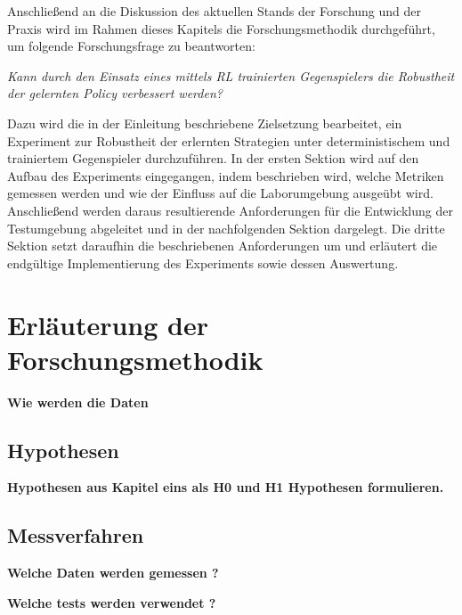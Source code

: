 Anschließend an die Diskussion des aktuellen Stands der Forschung und der Praxis wird im Rahmen dieses Kapitels die Forschungsmethodik durchgeführt, um folgende Forschungsfrage zu beantworten:

\textit{Kann durch den Einsatz eines mittels RL trainierten Gegenspielers die Robustheit der gelernten Policy verbessert werden?}

Dazu wird die in der Einleitung beschriebene Zielsetzung bearbeitet, ein Experiment zur Robustheit der erlernten Strategien unter deterministischem und trainiertem Gegenspieler durchzuführen.
In der ersten Sektion wird auf den Aufbau des Experiments eingegangen, indem beschrieben wird, welche Metriken gemessen werden und wie der Einfluss auf die Laborumgebung ausgeübt wird.
Anschließend werden daraus resultierende Anforderungen für die Entwicklung der Testumgebung abgeleitet und in der nachfolgenden Sektion dargelegt. 
Die dritte Sektion setzt daraufhin die beschriebenen Anforderungen um und erläutert die endgültige Implementierung des Experiments sowie dessen Auswertung.

\section{Erläuterung der Forschungsmethodik}

\textbf{Wie werden die Daten }

\subsection{Hypothesen}

\textbf{Hypothesen aus Kapitel eins als H0 und H1 Hypothesen formulieren.}

\subsection{Messverfahren}
\textbf{Welche Daten werden gemessen ?}

\textbf{Welche tests werden verwendet ?}